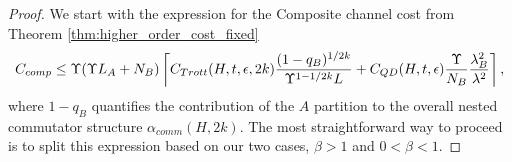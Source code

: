 \begin{proof}
    We start with the expression for the Composite channel cost from Theorem \ref{thm:higher_order_cost_fixed}    
    \begin{align}
         C_{comp} \leq \Upsilon (\Upsilon L_A + N_B) \left\lceil C_{Trott}(H, t, \epsilon, 2k) \frac{(1-q_B)^{1/2k}}{\Upsilon^{1-1/2k} L} + C_{QD}(H, t, \epsilon) \frac{\Upsilon}{N_B} \frac{\lambda_B^2}{\lambda^2} \right\rceil, \label{eq:cost_comparison_intermediate} 
    \end{align}
    where $1-q_B$ quantifies the contribution of the $A$ partition to the overall nested commutator structure $\alpha_{comm}(H,2k)$. The most 
    straightforward way to proceed is to split this expression based on our two cases, $\beta > 1$ and $0 < \beta < 1$. 
    

\end{proof}
